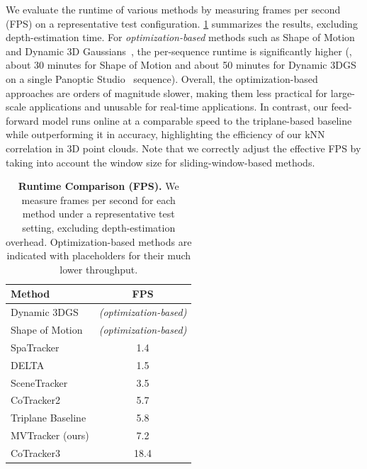 We evaluate the runtime of various methods by measuring frames per second (FPS) on a representative test configuration. \cref{tab:fps_comparison} summarizes the results, excluding depth-estimation time. For \emph{optimization-based} methods such as Shape of Motion~\cite{som2024} and Dynamic 3D Gaussians~\cite{luiten2023dynamic}, the per-sequence runtime is significantly higher (\eg, about 30 minutes for Shape of Motion and about 50 minutes for Dynamic 3DGS on a single Panoptic Studio~\cite{koppula2024tapvid} sequence). Overall, the optimization-based approaches are orders of magnitude slower, making them less practical for large-scale applications and unusable for real-time applications. In contrast, our feed-forward model runs online at a comparable speed to the triplane-based baseline while outperforming it in accuracy, highlighting the efficiency of our kNN correlation in 3D point clouds. Note that we correctly adjust the effective FPS by taking into account the window size for sliding-window-based methods.

\begin{table}[h]
\setlength{\tabcolsep}{2pt}
\centering
\caption{\textbf{Runtime Comparison (FPS).} We measure frames per second for each method under a representative test setting, excluding depth-estimation overhead. Optimization-based methods are indicated with placeholders for their much lower throughput.}
\vspace{-0.3cm}
\begin{tabular}{l c}
\toprule
\textbf{Method} & \textbf{FPS} \\
\midrule
Dynamic 3DGS~\cite{luiten2023dynamic}     & \emph{(optimization-based)} \\
Shape of Motion~\cite{som2024}            & \emph{(optimization-based)} \\
SpaTracker~\cite{xiao2024spatialtracker} &  1.4 \\
DELTA~\cite{ngo2024delta}                &  1.5 \\
SceneTracker~\cite{wang2024scenetracker} &  3.5 \\ %
CoTracker2~\cite{karaev2023cotracker}    &  5.7 \\
Triplane Baseline                        &  5.8 \\
\rowcolor{cyan!16}MVTracker (ours)      &  7.2 \\ %
CoTracker3~\cite{karaev24cotracker3}     & 18.4\\
\bottomrule
\end{tabular}
\label{tab:fps_comparison}
\end{table}





